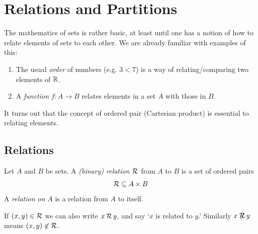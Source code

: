 \graphicspath{{7relations/asy/}}

\section{Relations and Partitions}\label{chap:relations}

The mathematics of sets is rather basic, at least until one has a notion of how to relate elements of sets to each other. We are already familiar with examples of this:
\begin{enumerate}
  \item The usual \emph{order} of numbers (e.g. $3<7$) is a way of relating/comparing two elements of $\mathbb{R}$.%
  \item A \emph{function} $f:A\to B$ relates elements in a set $A$ with those in $B$.
\end{enumerate}
It turns out that the concept of ordered pair (Cartesian product) is essential to relating elements.

\subsection{Relations}

\begin{defn}{}{}
	Let $A$ and $B$ be sets. A \emph{(binary) relation} $\mathcal{R}$ from $A$ to $B$ is a set of ordered pairs
	\[
		\mathcal{R}\subseteq A\times B
	\]
	A \emph{relation on} $A$ is a relation from $A$ to itself.\par
	If $(x,y)\in\mathcal{R}$ we can also write $x\,\mathcal{R}\,y$, and say `$x$ is related to $y$.' Similarly $x\not\!\!\mathcal{R}\,y$ means $(x,y)\not\in\mathcal{R}$.
\end{defn}

